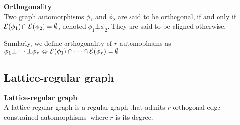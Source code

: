 \begin{definition}\textbf{Orthogonality}\\
Two graph automorphisms $\phi_1$ and $\phi_2$ are said to be orthogonal, if and only if $\mathcal{E}(\phi_1) \cap \mathcal{E}(\phi_2) = \emptyset$, denoted $\phi_1 \bot \phi_2$. They are said to be aligned otherwise.

Similarly, we define orthogonality of $r$ automophisms as $\phi_1 \bot \cdots \bot \phi_r \Leftrightarrow \mathcal{E}(\phi_1) \cap \cdots \cap \mathcal{E}(\phi_r) = \emptyset$
\end{definition}


\subsection{Lattice-regular graph}

\begin{definition}\textbf{Lattice-regular graph}\\
A lattice-regular graph is a regular graph that admits $r$ orthogonal edge-constrained automorphisms, where $r$ is its degree.
\end{definition}





